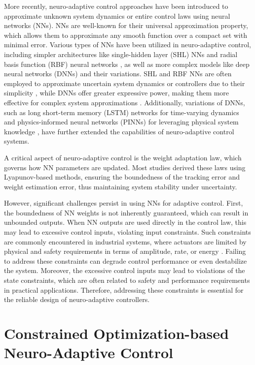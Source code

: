 \documentclass[conference]{IEEEtran}
\begin{document}
More recently, neuro-adaptive control approaches have been introduced to approximate unknown system dynamics or entire control laws using neural networks (NNs). 
NNs are well-known for their universal approximation property, which allows them to approximate any smooth function over a compact set with minimal error. 
Various types of NNs have been utilized in neuro-adaptive control, including simpler architectures like single-hidden layer (SHL) NNs \cite{Ge:2010aa} and radial basis function (RBF) neural networks \cite{Liu:2013ab}, as well as more complex models like deep neural networks (DNNs) \cite{Patil:2022aa} and their variations. 
SHL and RBF NNs are often employed to approximate uncertain system dynamics or controllers due to their simplicity \cite{Esfandiari:2015aa}, while DNNs offer greater expressive power, making them more effective for complex system approximations \cite{Rolnick:2018aa}. 
Additionally, variations of DNNs, such as long short-term memory (LSTM) networks for time-varying dynamics \cite{Liu:2013ab} and physics-informed neural networks (PINNs) for leveraging physical system knowledge \cite{Hart:2024aa}, have further extended the capabilities of neuro-adaptive control systems.

A critical aspect of neuro-adaptive control is the weight adaptation law, which governs how NN parameters are updated. 
Most studies derived these laws using Lyapunov-based methods, ensuring the boundedness of the tracking error and weight estimation error, thus maintaining system stability under uncertainty.

However, significant challenges persist in using NNs for adaptive control. 
First, the boundedness of NN weights is not inherently guaranteed, which can result in unbounded outputs. 
When NN outputs are used directly in the control law, this may lead to excessive control inputs, violating input constraints. 
Such constraints are commonly encountered in industrial systems, where actuators are limited by physical and safety requirements in terms of amplitude, rate, or energy \cite{Esfandiari:2021aa}. 
Failing to address these constraints can degrade control performance or even destabilize the system.
Moreover, the excessive control inputs may lead to violations of the state constraints, which are often related to safety and performance requirements in practical applications.
Therefore, addressing these constraints is essential for the reliable design of neuro-adaptive controllers. 

\section{Constrained Optimization-based Neuro-Adaptive Control}
\end{document}
